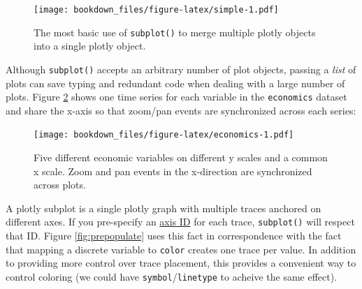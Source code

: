 \documentclass[12pt,]{isuthesis}
\newenvironment{Shaded}{\begin{snugshade}}{\end{snugshade}}
\newcommand{\KeywordTok}[1]{\textcolor[rgb]{0.13,0.29,0.53}{\textbf{{#1}}}}
\newcommand{\DataTypeTok}[1]{\textcolor[rgb]{0.13,0.29,0.53}{{#1}}}
\newcommand{\StringTok}[1]{\textcolor[rgb]{0.31,0.60,0.02}{{#1}}}
\newcommand{\OtherTok}[1]{\textcolor[rgb]{0.56,0.35,0.01}{{#1}}}
\newcommand{\NormalTok}[1]{{#1}}
\begin{document}
\begin{figure}[htbp]
\centering
\texttt{[image: bookdown\_files/figure-latex/simple-1.pdf]}
\caption{\label{fig:simple}The most basic use of \texttt{subplot()} to merge
multiple plotly objects into a single plotly object.}
\end{figure}

Although \texttt{subplot()} accepts an arbitrary number of plot objects,
passing a \emph{list} of plots can save typing and redundant code when
dealing with a large number of plots. Figure \ref{fig:economics} shows
one time series for each variable in the \texttt{economics} dataset and
share the x-axis so that zoom/pan events are synchronized across each
series:

\begin{Shaded}
\end{Shaded}

\begin{figure}[htbp]
\centering
\texttt{[image: bookdown\_files/figure-latex/economics-1.pdf]}
\caption{\label{fig:economics}Five different economic variables on different
y scales and a common x scale. Zoom and pan events in the x-direction
are synchronized across plots.}
\end{figure}

A plotly subplot is a single plotly graph with multiple traces anchored
on different axes. If you pre-specify an
\href{https://plot.ly/r/reference/\#scatter-yaxis}{axis ID} for each
trace, \texttt{subplot()} will respect that ID. Figure
\ref{fig:prepopulate} uses this fact in correspondence with the fact
that mapping a discrete variable to \texttt{color} creates one trace per
value. In addition to providing more control over trace placement, this
provides a convenient way to control coloring (we could have
\texttt{symbol}/\texttt{linetype} to acheive the same effect).
\end{document}
